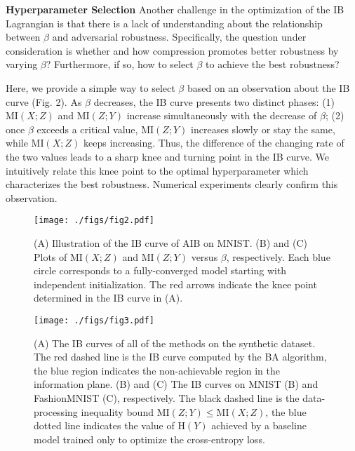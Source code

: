 \documentclass[10pt,journal,compsoc]{IEEEtran}
\begin{document}
\noindent \textbf{Hyperparameter Selection} \quad Another challenge in the optimization of the IB Lagrangian is that there is a lack of understanding about the relationship between $\beta$ and adversarial robustness. Specifically, the question under consideration is whether and how compression promotes better robustness by varying $\beta$? Furthermore, if so, how to select $\beta$ to achieve the best robustness?

Here, we provide a simple way to select $\beta$ based on an observation about the IB curve (Fig. 2). As $\beta$ decreases, the IB curve presents two distinct phases: (1) $\mathrm{MI}(X; Z)$ and $\mathrm{MI}(Z; Y)$ increase
simultaneously with the decrease of $\beta$; (2) once $\beta$ exceeds a critical value, $\mathrm{MI}(Z; Y)$ increases slowly or stay the same, while $\mathrm{MI}(X; Z)$ keeps increasing. Thus, the difference of the changing rate of the two values leads to a sharp knee and turning point in the IB curve.
We intuitively relate this knee point to the optimal hyperparameter which characterizes the best robustness. Numerical experiments clearly confirm this observation.
\begin{figure}
  \centering
  \texttt{[image: ./figs/fig2.pdf]}
  \caption{(A) Illustration of the IB curve of AIB on MNIST. (B) and (C) Plots of $\mathrm{MI}(X; Z)$ and $\mathrm{MI}(Z; Y)$ versus $\beta$, respectively. Each blue circle corresponds to a fully-converged model starting with independent initialization. The red arrows indicate the knee point determined in the IB curve in (A). }
  \label{img:fig2}
\end{figure}



\begin{figure*}
	\centering
	\texttt{[image: ./figs/fig3.pdf]}
	\caption{(A) The IB curves of all of the methods on the synthetic dataset. The red dashed line is the IB curve computed by the BA algorithm, the blue region indicates the non-achievable region in the information plane. (B) and (C) The IB curves on MNIST (B) and FashionMNIST (C), respectively.
		The black dashed line is the data-processing inequality bound $\mathrm{MI}(Z; Y) \leq \mathrm{MI}(X; Z)$, the blue dotted line indicates the value of $\mathrm{H}(Y)$ achieved by a baseline model trained only to optimize the cross-entropy loss. }
	\label{img:fig3}
\end{figure*}
\end{document}
